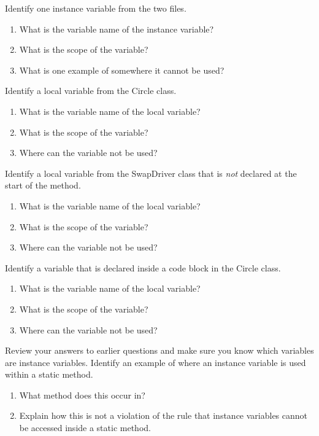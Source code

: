 \Q Identify one instance variable from the two files. 
\begin{enumerate}
\item What is the variable name of the instance variable?
\item What is the scope of the variable?
\item What is one example of somewhere it cannot be used?
\end{enumerate}


\Q Identify a local variable from the Circle class.
\begin{enumerate}
\item What is the variable name of the local variable? 
\item What is the scope of the variable?
\item Where can the variable not be used?
\end{enumerate}


\Q Identify a local variable from the SwapDriver class that is \emph{not} declared at the start of the method.
\begin{enumerate}
\item What is the variable name of the local variable? 
\item What is the scope of the variable?
\item Where can the variable not be used?
\end{enumerate}


\Q Identify a variable that is declared inside a code block in the Circle class.
\begin{enumerate}
\item What is the variable name of the local variable? 
\item What is the scope of the variable?
\item Where can the variable not be used?
\end{enumerate}




\Q Review your answers to earlier questions and make sure you know which variables are instance variables. Identify an example of where an instance variable is used within a static method.
\begin{enumerate}
\item What method does this occur in? 
\item Explain how this is not a violation of the rule that instance variables cannot be accessed inside a static method.
\end{enumerate}


